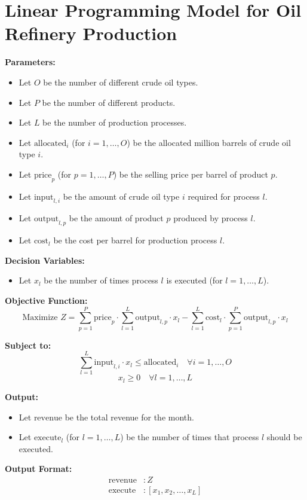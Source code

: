 \documentclass{article}
\begin{document}
\section*{Linear Programming Model for Oil Refinery Production}

\textbf{Parameters:}
\begin{itemize}
    \item Let $O$ be the number of different crude oil types.
    \item Let $P$ be the number of different products.
    \item Let $L$ be the number of production processes.
    \item Let $\text{allocated}_i$ (for $i = 1, \ldots, O$) be the allocated million barrels of crude oil type $i$.
    \item Let $\text{price}_p$ (for $p = 1, \ldots, P$) be the selling price per barrel of product $p$.
    \item Let $\text{input}_{l,i}$ be the amount of crude oil type $i$ required for process $l$.
    \item Let $\text{output}_{l,p}$ be the amount of product $p$ produced by process $l$.
    \item Let $\text{cost}_l$ be the cost per barrel for production process $l$.
\end{itemize}

\textbf{Decision Variables:}
\begin{itemize}
    \item Let $x_l$ be the number of times process $l$ is executed (for $l = 1, \ldots, L$).
\end{itemize}

\textbf{Objective Function:}
\[
\text{Maximize } Z = \sum_{p=1}^{P} \text{price}_p \cdot \sum_{l=1}^{L} \text{output}_{l,p} \cdot x_l - \sum_{l=1}^{L} \text{cost}_l \cdot \sum_{p=1}^{P} \text{output}_{l,p} \cdot x_l
\]

\textbf{Subject to:}
\[
\sum_{l=1}^{L} \text{input}_{l,i} \cdot x_l \leq \text{allocated}_i \quad \forall i = 1, \ldots, O
\]
\[
x_l \geq 0 \quad \forall l = 1, \ldots, L
\]

\textbf{Output:}
\begin{itemize}
    \item Let $\text{revenue}$ be the total revenue for the month.
    \item Let $\text{execute}_l$ (for $l = 1, \ldots, L$) be the number of times that process $l$ should be executed.
\end{itemize}

\textbf{Output Format:}
\[
\begin{align*}
    \text{revenue} & : Z \\
    \text{execute} & : [x_1, x_2, \ldots, x_L]
\end{align*}
\]
\end{document}
